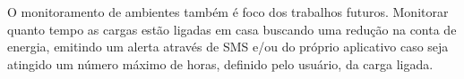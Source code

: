 \documentclass[
12pt,
openany, %
oneside, %
a4paper,			
english,			
brazil			        %
]{abntbibufjf}
\begin{document}
	 O monitoramento de ambientes também é foco dos trabalhos futuros. Monitorar quanto tempo as cargas estão ligadas em casa buscando uma redução na conta de energia, emitindo um alerta através de SMS e/ou do próprio aplicativo caso seja atingido um número máximo de horas, definido pelo usuário, da carga ligada.
	



	
	
	\postextual
	
    
	
    
    
    
	

\end{document}
